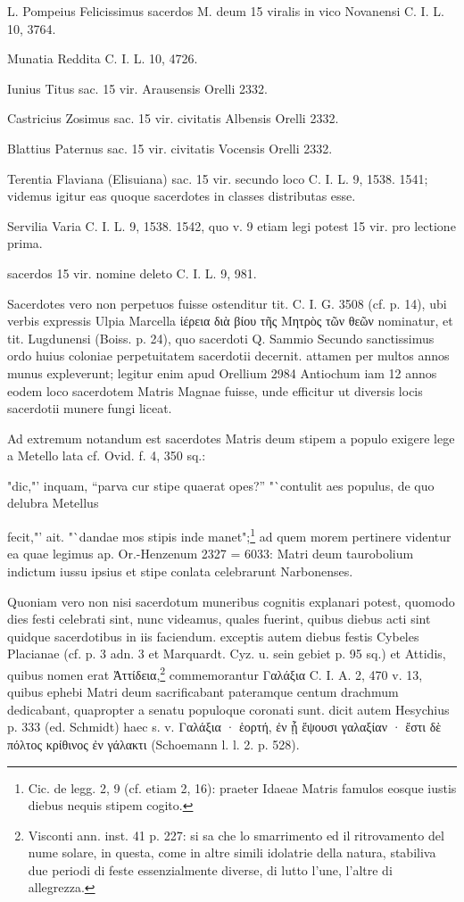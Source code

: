 \documentclass[a4paper, 11pt, oneside, polutonikogreek, german, twocolumn]{article}
\begin{document}
L. Pompeius Felicissimus sacerdos M. deum 15 viralis in vico Novanensi C. I. L. 10, 3764.

Munatia Reddita C. I. L. 10, 4726.

Iunius Titus sac. 15 vir. Arausensis Orelli 2332.

Castricius Zosimus sac. 15 vir. civitatis Albensis Orelli 2332.

Blattius Paternus sac. 15 vir. civitatis Vocensis Orelli 2332.

Terentia Flaviana (Elisuiana) sac. 15 vir. secundo loco C. I. L. 9, 1538. 1541; videmus igitur eas quoque sacerdotes in classes distributas esse.

Servilia Varia C. I. L. 9, 1538. 1542, quo v. 9 etiam legi potest 15 vir. pro lectione prima.

sacerdos 15 vir. nomine deleto C. I. L. 9, 981.

Sacerdotes vero non perpetuos fuisse ostenditur tit. C. I. G. 3508 (cf. p. 14), ubi verbis expressis Ulpia Marcella ἱέρεια διὰ βίου τῆς Μητρὸς τῶν θεῶν nominatur, et tit. Lugdunensi (Boiss. p. 24), quo sacerdoti Q. Sammio Secundo sanctissimus ordo huius coloniae perpetuitatem sacerdotii decernit. attamen per multos annos munus expleverunt; legitur enim apud Orellium 2984 Antiochum iam 12 annos eodem loco sacerdotem Matris Magnae fuisse, unde efficitur ut diversis locis sacerdotii munere fungi liceat.

Ad extremum notandum est sacerdotes Matris deum stipem a populo exigere lege a Metello lata cf. Ovid. f. 4, 350 sq.:

"dic,"' inquam, "`parva cur stipe quaerat opes?"'  "`contulit aes populus, de quo delubra Metellus

fecit,"' ait. "`dandae mos stipis inde manet";\footnote{Cic. de legg. 2, 9 (cf. etiam 2, 16): praeter Idaeae Matris famulos eosque iustis diebus nequis stipem cogito.} ad quem morem pertinere videntur ea quae legimus ap. Or.-Henzenum 2327 = 6033: Matri deum taurobolium indictum iussu ipsius et stipe conlata celebrarunt Narbonenses.

Quoniam vero non nisi sacerdotum muneribus cognitis explanari potest, quomodo dies festi celebrati sint, nunc videamus, quales fuerint, quibus diebus acti sint quidque sacerdotibus in iis faciendum. exceptis autem diebus festis Cybeles Placianae (cf. p. 3 adn. 3 et Marquardt. Cyz. u. sein gebiet p. 95 sq.) et Attidis, quibus nomen erat Ἀττίδεια,\footnote{Visconti ann. inst. 41 p. 227: si sa che lo smarrimento ed il ritrovamento del nume solare, in questa, come in altre simili idolatrie della natura, stabiliva due periodi di feste essenzialmente diverse, di lutto l'une, l'altre di allegrezza.} commemorantur Γαλάξια C. I. A. 2, 470 v. 13, quibus ephebi Matri deum sacrificabant pateramque centum drachmum dedicabant, quapropter a senatu populoque coronati sunt. dicit autem Hesychius p. 333 (ed. Schmidt) haec s. v. Γαλάξια · ἑορτή, ἐν ᾗ ἕψουσι γαλαξίαν · ἔστι δὲ πόλτος κρίθινος ἐν γάλακτι (Schoemann l. l. 2. p. 528).
\end{document}
